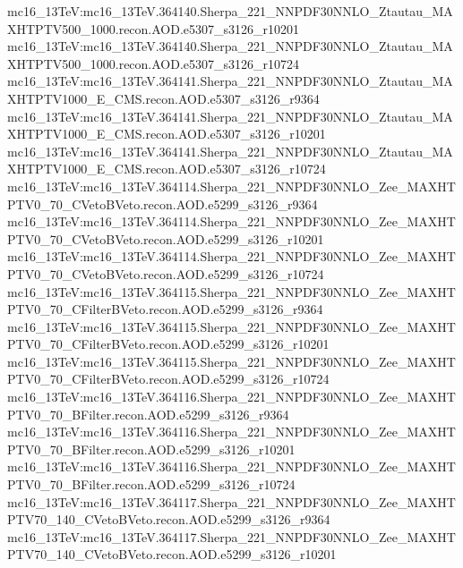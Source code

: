 { mc16\_13TeV:mc16\_13TeV.364140.Sherpa\_221\_NNPDF30NNLO\_Ztautau\_MAXHTPTV500\_1000.recon.AOD.e5307\_s3126\_r10201 \newline  
 mc16\_13TeV:mc16\_13TeV.364140.Sherpa\_221\_NNPDF30NNLO\_Ztautau\_MAXHTPTV500\_1000.recon.AOD.e5307\_s3126\_r10724  \newline 
 mc16\_13TeV:mc16\_13TeV.364141.Sherpa\_221\_NNPDF30NNLO\_Ztautau\_MAXHTPTV1000\_E\_CMS.recon.AOD.e5307\_s3126\_r9364  \newline 
 mc16\_13TeV:mc16\_13TeV.364141.Sherpa\_221\_NNPDF30NNLO\_Ztautau\_MAXHTPTV1000\_E\_CMS.recon.AOD.e5307\_s3126\_r10201 \newline 
 mc16\_13TeV:mc16\_13TeV.364141.Sherpa\_221\_NNPDF30NNLO\_Ztautau\_MAXHTPTV1000\_E\_CMS.recon.AOD.e5307\_s3126\_r10724 \newline  
 mc16\_13TeV:mc16\_13TeV.364114.Sherpa\_221\_NNPDF30NNLO\_Zee\_MAXHTPTV0\_70\_CVetoBVeto.recon.AOD.e5299\_s3126\_r9364  \newline 
 mc16\_13TeV:mc16\_13TeV.364114.Sherpa\_221\_NNPDF30NNLO\_Zee\_MAXHTPTV0\_70\_CVetoBVeto.recon.AOD.e5299\_s3126\_r10201  \newline 
 mc16\_13TeV:mc16\_13TeV.364114.Sherpa\_221\_NNPDF30NNLO\_Zee\_MAXHTPTV0\_70\_CVetoBVeto.recon.AOD.e5299\_s3126\_r10724 \newline  
 mc16\_13TeV:mc16\_13TeV.364115.Sherpa\_221\_NNPDF30NNLO\_Zee\_MAXHTPTV0\_70\_CFilterBVeto.recon.AOD.e5299\_s3126\_r9364 \newline  
 mc16\_13TeV:mc16\_13TeV.364115.Sherpa\_221\_NNPDF30NNLO\_Zee\_MAXHTPTV0\_70\_CFilterBVeto.recon.AOD.e5299\_s3126\_r10201 \newline  
 mc16\_13TeV:mc16\_13TeV.364115.Sherpa\_221\_NNPDF30NNLO\_Zee\_MAXHTPTV0\_70\_CFilterBVeto.recon.AOD.e5299\_s3126\_r10724 \newline  
 mc16\_13TeV:mc16\_13TeV.364116.Sherpa\_221\_NNPDF30NNLO\_Zee\_MAXHTPTV0\_70\_BFilter.recon.AOD.e5299\_s3126\_r9364 \newline  
 mc16\_13TeV:mc16\_13TeV.364116.Sherpa\_221\_NNPDF30NNLO\_Zee\_MAXHTPTV0\_70\_BFilter.recon.AOD.e5299\_s3126\_r10201  \newline 
 mc16\_13TeV:mc16\_13TeV.364116.Sherpa\_221\_NNPDF30NNLO\_Zee\_MAXHTPTV0\_70\_BFilter.recon.AOD.e5299\_s3126\_r10724 \newline  
 mc16\_13TeV:mc16\_13TeV.364117.Sherpa\_221\_NNPDF30NNLO\_Zee\_MAXHTPTV70\_140\_CVetoBVeto.recon.AOD.e5299\_s3126\_r9364 \newline  
 mc16\_13TeV:mc16\_13TeV.364117.Sherpa\_221\_NNPDF30NNLO\_Zee\_MAXHTPTV70\_140\_CVetoBVeto.recon.AOD.e5299\_s3126\_r10201 \newline  
}
